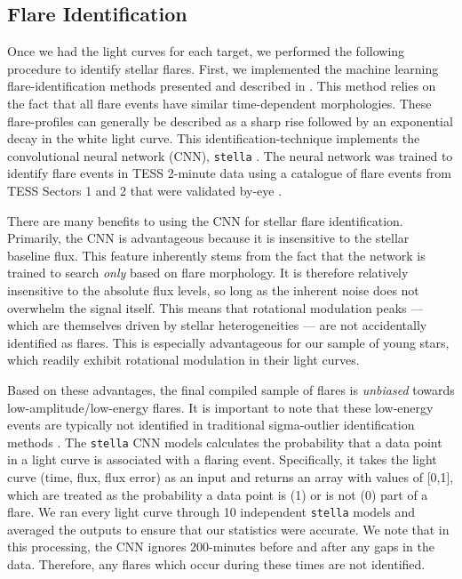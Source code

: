 \documentclass[twocolumn]{aastex631}
\begin{document}
\subsection{Flare Identification}\label{subsec2:Flareidentification}

Once we had the light curves for each target, we performed the following procedure to identify stellar flares. First, we implemented the machine learning flare-identification methods presented and described in \cite{feinstein20}. This method relies on the fact that all flare events have similar time-dependent morphologies. These flare-profiles can generally be described as a sharp rise followed by an exponential decay in the white light curve. This identification-technique implements the convolutional neural network (CNN),
\texttt{stella} \citep{feinstein20}. The neural network was trained to identify flare events in TESS 2-minute data using a catalogue of flare events from TESS Sectors 1 and 2 that were validated  by-eye
\citep{guenther19_flares}.

There are many benefits to using the CNN for stellar flare identification. Primarily, the CNN is advantageous because it is insensitive to the stellar baseline flux. This feature inherently stems from the fact that the network is trained to search \textit{only} based on flare morphology. It is therefore relatively insensitive to the absolute flux levels, so long as the inherent noise does not overwhelm the signal itself. This means that rotational modulation peaks --- which are themselves driven by
stellar heterogeneities --- are not accidentally identified as flares. This is especially advantageous for our sample of young stars, which  readily exhibit rotational modulation in their light curves.

Based on these advantages, the final compiled sample of flares is \textit{unbiased} towards low-amplitude/low-energy flares. It is important to note that these low-energy events are typically not identified in traditional sigma-outlier identification
methods \citep{chang15}. The \texttt{stella} CNN models calculates the probability that a data point in a light curve is associated with a flaring event. Specifically, it takes the light curve (time, flux, flux error) as an input and returns an array with values of [0,1], which are treated as the probability a data point is (1) or is not (0) part of a flare. We ran every light curve through 10 independent \texttt{stella} models and averaged the outputs to ensure that our statistics were accurate. We note that in this processing, the CNN ignores 200-minutes before and after any gaps in the data. Therefore, any flares which occur during these times are not identified.
\end{document}

